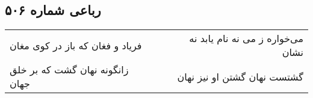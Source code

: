 \begin{center}
\section*{رباعی شماره ۵۰۶}
\label{sec:sh506}
\begin{longtable}{l p{0.5cm} r}
فریاد و فغان که باز در کوی مغان
&&
می‌خواره ز می نه نام یابد نه نشان
\\
زانگونه نهان گشت که بر خلق جهان
&&
گشتست نهان گشتن او نیز نهان
\\
\end{longtable}
\end{center}
